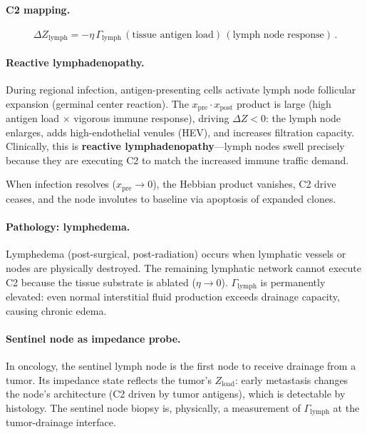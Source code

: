 \documentclass[aps,pre,twocolumn,superscriptaddress,floatfix]{revtex4-2}
\begin{document}
\paragraph{C2 mapping.}
\begin{equation}
  \Delta Z_{\text{lymph}} =
  -\eta\,\Gamma_{\text{lymph}}\,
  (\text{tissue antigen load})\,
  (\text{lymph node response})\,.
  \label{eq:c2-lymph}
\end{equation}

\paragraph{Reactive lymphadenopathy.}
During regional infection, antigen-presenting
cells activate lymph node follicular expansion
(germinal center reaction).
The $x_{\text{pre}} \cdot x_{\text{post}}$ product
is large (high antigen load $\times$ vigorous
immune response), driving $\Delta Z < 0$:
the lymph node enlarges, adds high-endothelial
venules (HEV), and increases filtration capacity.
Clinically, this is \textbf{reactive
lymphadenopathy}---lymph nodes swell precisely
because they are executing C2 to match the
increased immune traffic demand.

When infection resolves ($x_{\text{pre}} \to 0$),
the Hebbian product vanishes, C2 drive ceases,
and the node involutes to baseline via
apoptosis of expanded clones.

\paragraph{Pathology: lymphedema.}
Lymphedema (post-surgical, post-radiation)
occurs when lymphatic vessels or nodes are
physically destroyed.
The remaining lymphatic network cannot execute C2
because the tissue substrate is ablated
($\eta \to 0$).  $\Gamma_{\text{lymph}}$ is
permanently elevated: even normal interstitial
fluid production exceeds drainage capacity,
causing chronic edema.

\paragraph{Sentinel node as impedance probe.}
In oncology, the sentinel lymph node is the
first node to receive drainage from a tumor.
Its impedance state reflects the tumor's
$Z_{\text{load}}$: early metastasis changes
the node's architecture (C2 driven by tumor
antigens), which is detectable by histology.
The sentinel node biopsy is, physically,
a measurement of $\Gamma_{\text{lymph}}$ at
the tumor-drainage interface.
\end{document}
